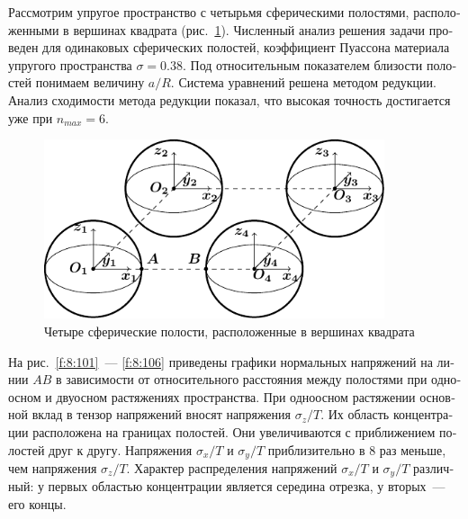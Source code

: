 \begin{russian}
Рассмотрим упругое пространство с четырьмя сферическими полостями, расположенными в вершинах квадрата (рис.~\ref{f:8:100}). Численный анализ решения задачи проведен для одинаковых сферических полостей, коэффициент Пуассона материала упругого пространства $\sigma=0.38$. Под относительным показателем близости полостей понимаем величину $a/R$. Система уравнений решена методом редукции. Анализ сходимости метода редукции показал, что высокая точность достигается уже при $n_{max}=6$.

\begin{figure}[h!]
\centering
\includegraphics[width=10cm]{cartesian-spheres-4.pdf}
\caption{Четыре сферические полости, расположенные в вершинах квадрата}
\label{f:8:100}
\end{figure}

На рис.~\ref{f:8:101}~--- \ref{f:8:106} приведены графики нормальных напряжений на линии $AB$ в зависимости от относительного расстояния между полостями при одноосном и двуосном растяжениях пространства. При одноосном растяжении основной вклад в тензор напряжений вносят напряжения $\sigma_z/T$. Их область концентрации расположена на границах полостей. Они увеличиваются с приближением полостей друг к другу. Напряжения $\sigma_x/T$ и $\sigma_y/T$ приблизительно в 8 раз меньше, чем напряжения $\sigma_z/T$. Характер распределения напряжений $\sigma_x/T$ и $\sigma_y/T$ различный: у первых областью концентрации является середина отрезка, у вторых~--- его концы.


\end{russian}
